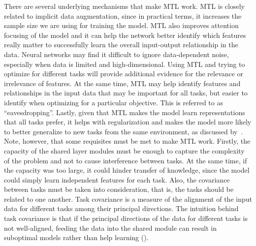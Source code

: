 \documentclass[11pt]{article}
\numberwithin{equation}{section}
\theoremstyle{plain}
\theoremstyle{definition}
\begin{document}
There are several underlying mechanisms that make MTL work. MTL is closely related to implicit data augmentation, since in practical terms, it increases the sample size we are using for training the model. MTL also improves attention focusing of the model and it can help the network better identify which features really matter to  successfully learn the overall input-output relationship in the data. Neural networks may find it difficult to ignore data-dependent noise, especially when data is limited and high-dimensional. Using MTL and trying to optimize for different tasks will provide additional evidence for the relevance or irrelevance of features. At the same time, MTL may help identify features and relationships in the input data that may be important for all tasks, but easier to identify when optimizing for a particular objective. This is referred to as ``eavesdropping''. Lastly, given that MTL makes the model learn representations that all tasks prefer, it helps with regularization and makes the model more likely to better generalize to new tasks from the same environment, as discussed by~\cite{bias_learning}. Note, however, that some requisites must be met to make MTL work. Firstly, the capacity of the shared layer modules must be enough to capture the complexity of the problem and not to cause interference between tasks. At the same time, if the capacity was too large, it could hinder transfer of knowledge, since the model could simply learn independent features for each task. Also, the covariance between tasks must be taken into consideration, that is, the tasks should be related to one another. Task covariance is a measure of the alignment of the input data for different tasks among their principal directions. The intuition behind task covariance is that if the principal directions of the data for different tasks is not well-aligned, feeding the data into the shared module can result in suboptimal models rather than help learning (\cite{senwu}). 
\end{document}
